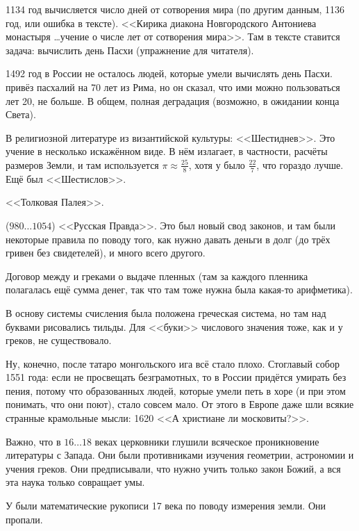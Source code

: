 \documentclass[a4paper,oneside,fleqn,10pt]{article}
\newcommand{\pe}[2]{${#1}\ldots{#2}$}
\begin{document}
1134 год вычисляется число дней от сотворения мира (по другим данным,
1136 год, или ошибка в тексте). <<Кирика диакона Новгородского
Антониева монастыря \ldots учение о числе лет от сотворения
мира>>. Там в тексте ставится задача: вычислить день Пасхи (упражнение
для читателя).

1492 год в России не осталось людей, которые умели вычислять день
Пасхи.   привёз пасхалий на
70 лет из Рима, но он сказал, что ими можно пользоваться лет 20, не
больше.  В общем, полная деградация (возможно, в ожидании конца
Света).

В религиозной литературе из византийской культуры: <<Шестиднев>>. Это
учение  в несколько искажённом виде.  В
нём  излагает, в частности, расчёты
размеров Земли, и там используется $\pi \approx \frac{25}{8}$, хотя у
 было $\frac{22}{7}$, что гораздо лучше. Ещё
был <<Шестислов>>.

<<Толковая Палея>>.

 (\pe{980}{1054}) <<Русская Правда>>. Это был
новый свод законов, и там были некоторые правила по поводу того, как
нужно давать деньги в долг (до трёх гривен без свидетелей), и много
всего другого.

Договор между  и греками о выдаче пленных
(там за каждого пленника полагалась ещё сумма денег, так что там тоже
нужна была какая-то арифметика).

В основу системы счисления была положена греческая система, но там над
буквами рисовались тильды.  Для <<буки>> числового значения тоже, как
и у греков, не существовало.

Ну, конечно, после татаро монгольского ига всё стало плохо.  Стоглавый
собор 1551 года: если не просвещать безграмотных, то в России придётся
умирать без пения, потому что образованных людей, которые умели петь в
хоре (и при этом понимать, что они поют), стало совсем мало.  От этого
в Европе даже шли всякие странные крамольные мысли: 1620  <<А христиане ли московиты?>>.

Важно, что в \pe{16}{18} веках церковники глушили всяческое
проникновение литературы с Запада.  Они были противниками изучения
геометрии, астрономии и учения греков. Они предписывали, что нужно
учить только закон Божий, а вся эта наука только совращает умы.

У  были математические рукописи 17 века по
поводу измерения земли.  Они пропали.
\end{document}
